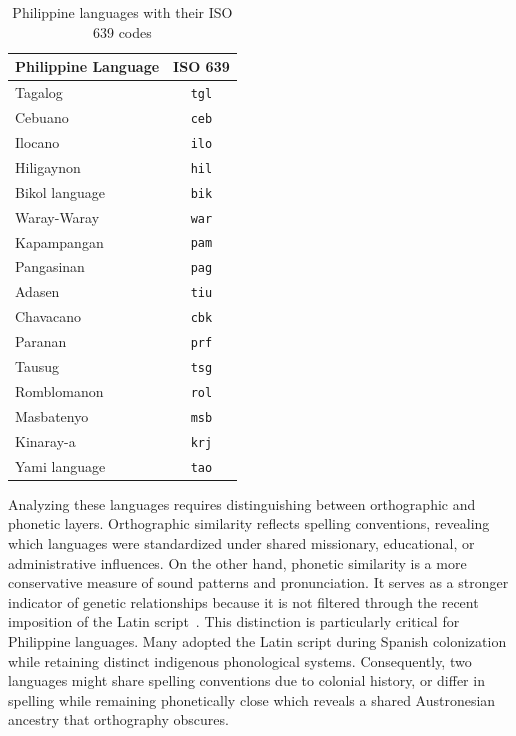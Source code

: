 \begin{table}[h!]
    \centering
    \begin{tabular}{lc}
        \hline
        \textbf{Philippine Language} & \textbf{ISO 639} \\
        \hline
        Tagalog                      & \texttt{tgl}     \\
        Cebuano                      & \texttt{ceb}     \\
        Ilocano                      & \texttt{ilo}     \\
        Hiligaynon                   & \texttt{hil}     \\
        Bikol language~\footnotemark & \texttt{bik}     \\
        Waray-Waray                  & \texttt{war}     \\
        Kapampangan                  & \texttt{pam}     \\
        Pangasinan                   & \texttt{pag}     \\
        Adasen                       & \texttt{tiu}     \\
        Chavacano                    & \texttt{cbk}     \\
        Paranan                      & \texttt{prf}     \\
        Tausug                       & \texttt{tsg}     \\
        Romblomanon                  & \texttt{rol}     \\
        Masbatenyo                   & \texttt{msb}     \\
        Kinaray-a                    & \texttt{krj}     \\
        Yami language                & \texttt{tao}     \\
        \hline
    \end{tabular}
    \caption{Philippine languages with their ISO 639 codes}\label{tab:ph_languages}
\end{table}

Analyzing these languages requires distinguishing between orthographic and
phonetic layers. Orthographic similarity reflects spelling conventions,
revealing which languages were standardized under shared missionary,
educational, or administrative influences. On the other hand, phonetic
similarity is a more conservative measure of sound patterns and pronunciation.
It serves as a stronger indicator of genetic relationships because it is not
filtered through the recent imposition of the Latin script~\cite{Blust_1991}.
This distinction is particularly critical for Philippine languages. Many
adopted the Latin script during Spanish colonization while retaining distinct
indigenous phonological systems. Consequently, two languages might share
spelling conventions due to colonial history, or differ in spelling while
remaining phonetically close which reveals a shared Austronesian ancestry that
orthography obscures.

